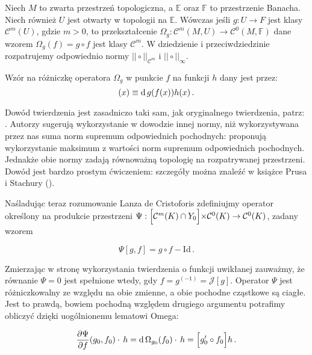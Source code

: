 \begin{tw}\label{true_omega}
 
	Niech $ M $ to zwarta przestrzeń topologiczna, a $ \mathbb{E} $ oraz $ \mathbb{F} $ to przestrzenie Banacha. Niech również $ U $ jest otwarty w topologii na $ \mathbb{E} $. Wówczas jeśli $ g: U \rightarrow F $ jest klasy $ \mathcal{C}^{m}(U) $, gdzie $ m >0 $, to przekształcenie $ \Omega_g : \mathcal{C}^{m}(M, U) \rightarrow \mathcal{C}^{0}(M, \mathbb{F}) $ dane wzorem $ \Omega_g (f) = g \circ f $ jest klasy $ \mathcal{C}^{m} $. W dziedzienie i przeciwdziedzinie rozpatrujemy odpowiednio normy $||\circ||_{\mathcal{C}^{m}}$ i $||\circ||_{\infty}$. 
	
Wzór na różniczkę operatora $ \Omega_g $ w punkcie $ f $ na funkcji $ h $ dany jest przez:
\begin{equation*}
 [\diff{\Omega_g}(f)\cdot\,h](x) \equiv \diff{g}(f(x))h(x)\,.
\end{equation*}
\end{tw} 	

Dowód twierdzenia jest zasadniczo taki sam, jak oryginalnego twierdzenia, patrz: \citet{Mardsen}. Autorzy sugerują wykorzystanie w dowodzie innej normy, niż wykorzystywana przez nas suma norm supremum odpowiednich pochodnych: proponują wykorzystanie maksimum z wartości norm supremum odpowiednich pochodnych. Jednakże obie normy zadają równoważną topologię na rozpatrywanej przestrzeni. Dowód jest bardzo prostym ćwiczeniem: szczegóły można znaleźć w książce Prusa i Stachury (\citeyear[][ćw. 2.B.33., str. 28]{Prus}). 

Naśladując teraz rozumowanie Lanza de Cristoforis zdefiniujmy operator określony na produkcie przestrzeni $\Psi: \Bigl[\mathcal{C}^{m}(K) \cap Y_0 \Bigl]\times \mathcal{C}^{0}(K) \rightarrow \mathcal{C}^0 (K)$, zadany wzorem

\begin{equation*}
	\Psi[g,f] = g \circ f - \mathrm{Id}\,.
\end{equation*}

Zmierzając w stronę wykorzystania twierdzenia o funkcji uwikłanej zauważmy, że równanie $\Psi = 0$ jest spełnione wtedy, gdy $f = g^{(-1)} = \mathcal{J}[g]$. Operator $\Psi$ jest różniczkowalny ze względu na obie zmienne, a obie pochodne cząstkowe są ciagłe. Jest to prawdą, bowiem pochodną względem drugiego argumentu potrafimy obliczyć dzięki uogólnionemu lematowi Omega:

\begin{equation*}
	\frac{\partial \Psi}{\partial f}(g_0,f_0) \cdot\, h = \mathrm{d}\,\Omega_{g_0}(f_0) \cdot\, h =  \Bigl[g_0'\circ f_0 \Bigl] h\,.
\end{equation*}

